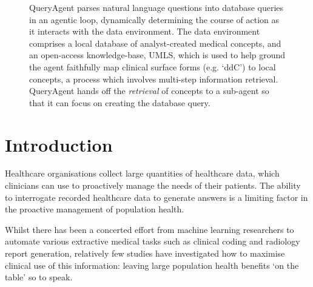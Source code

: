 \documentclass[11pt]{article}
\begin{document}
\begin{figure}[htbp]
\centering

\caption{
QueryAgent parses natural language questions into database queries in an agentic loop, dynamically determining the course of action as it interacts with the data environment.
The data environment comprises a local database of analyst-created medical concepts, and an open-access knowledge-base, UMLS, which is used to help ground the agent faithfully map clinical surface forms (e.g. `ddC') to local concepts, a process which involves multi-step information retrieval.
QueryAgent hands off the \textit{retrieval} of concepts to a sub-agent so that it can focus on creating the database query.}
\label{fig:question-to-query}

\end{figure}

\section{Introduction}

Healthcare organisations collect large quantities of healthcare data, which clinicians can use to proactively manage the needs of their patients.
The ability to interrogate recorded healthcare data to generate answers is a limiting factor in the proactive management of population health.

Whilst there has been a concerted effort from machine learning researchers to automate various extractive medical tasks such as clinical coding and radiology report generation, relatively few studies have investigated how to maximise clinical use of this information: leaving large population health benefits `on the table' so to speak.


\end{document}
